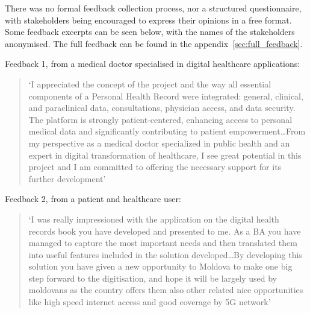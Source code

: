 There was no formal feedback collection process, nor a structured questionnaire, with stakeholders being encouraged to express their opinions in a free format. Some feedback excerpts can be seen below, with the names of the stakeholders anonymised. The full feedback can be found in the appendix~\ref{sec:full_feedback}.


Feedback 1, from a medical doctor specialised in digital healthcare applications:

\begin{quotation}
    `I appreciated the concept of the project and the way all essential components of a Personal Health Record were integrated: general, clinical, and paraclinical data, consultations, physician access, and data security. The platform is strongly patient-centered, enhancing access to personal medical data and significantly contributing to patient empowerment\dots From my perspective as a medical doctor specialized in public health and an expert in digital transformation of healthcare, I see great potential in this project and I am committed to offering the necessary support for its further development'
\end{quotation}

Feedback 2, from a patient and healthcare user:

\begin{quotation}
    `I was really impressioned with the application on the digital health records book you have developed and presented to me. As a BA you have managed to capture the most important needs and then translated them into useful features included in the solution developed\dots By developing this solution you have given a new opportunity to Moldova to make one big step forward to the digitisation, and hope it will be largely used by moldovans as the country offers them also other related nice opportunities like high speed internet access and good coverage by 5G network'
\end{quotation}
